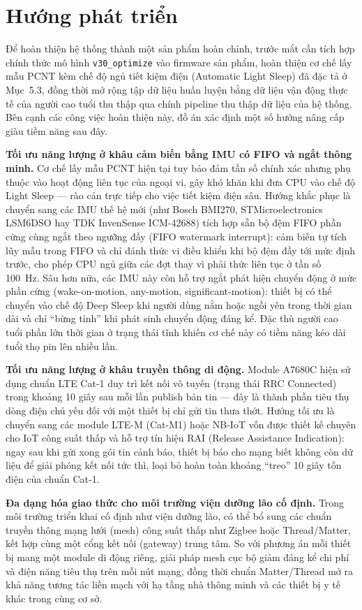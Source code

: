 \documentclass[../DoAn.tex]{subfiles}
\begin{document}
\section{Hướng phát triển}
Để hoàn thiện hệ thống thành một sản phẩm hoàn chỉnh, trước mắt cần tích hợp chính thức mô hình \texttt{v30\_optimize} vào firmware sản phẩm, hoàn thiện cơ chế lấy mẫu PCNT kèm chế độ ngủ tiết kiệm điện (Automatic Light Sleep) đã đặc tả ở Mục~5.3, đồng thời mở rộng tập dữ liệu huấn luyện bằng dữ liệu vận động thực tế của người cao tuổi thu thập qua chính pipeline thu thập dữ liệu của hệ thống. Bên cạnh các công việc hoàn thiện này, đồ án xác định một số hướng nâng cấp giàu tiềm năng sau đây.

\textbf{Tối ưu năng lượng ở khâu cảm biến bằng IMU có FIFO và ngắt thông minh.} Cơ chế lấy mẫu PCNT hiện tại tuy bảo đảm tần số chính xác nhưng phụ thuộc vào hoạt động liên tục của ngoại vi, gây khó khăn khi đưa CPU vào chế độ Light Sleep --- rào cản trực tiếp cho việc tiết kiệm điện sâu. Hướng khắc phục là chuyển sang các IMU thế hệ mới (như Bosch BMI270, STMicroelectronics LSM6DSO hay TDK InvenSense ICM-42688) tích hợp sẵn bộ đệm FIFO phần cứng cùng ngắt theo ngưỡng đầy (FIFO watermark interrupt): cảm biến tự tích lũy mẫu trong FIFO và chỉ đánh thức vi điều khiển khi bộ đệm đầy tới mức định trước, cho phép CPU ngủ giữa các đợt thay vì phải thức liên tục ở tần số 100~Hz. Sâu hơn nữa, các IMU này còn hỗ trợ ngắt phát hiện chuyển động ở mức phần cứng (wake-on-motion, any-motion, significant-motion): thiết bị có thể chuyển vào chế độ Deep Sleep khi người dùng nằm hoặc ngồi yên trong thời gian dài và chỉ ``bừng tỉnh'' khi phát sinh chuyển động đáng kể. Đặc thù người cao tuổi phần lớn thời gian ở trạng thái tĩnh khiến cơ chế này có tiềm năng kéo dài tuổi thọ pin lên nhiều lần.

\textbf{Tối ưu năng lượng ở khâu truyền thông di động.} Module A7680C hiện sử dụng chuẩn LTE Cat-1 duy trì kết nối vô tuyến (trạng thái RRC Connected) trong khoảng 10 giây sau mỗi lần publish bản tin --- đây là thành phần tiêu thụ dòng điện chủ yếu đối với một thiết bị chỉ gửi tin thưa thớt. Hướng tối ưu là chuyển sang các module LTE-M (Cat-M1) hoặc NB-IoT vốn được thiết kế chuyên cho IoT công suất thấp và hỗ trợ tín hiệu RAI (Release Assistance Indication): ngay sau khi gửi xong gói tin cảnh báo, thiết bị báo cho mạng biết không còn dữ liệu để giải phóng kết nối tức thì, loại bỏ hoàn toàn khoảng ``treo'' 10 giây tốn điện của chuẩn Cat-1.

\textbf{Đa dạng hóa giao thức cho môi trường viện dưỡng lão cố định.} Trong môi trường triển khai cố định như viện dưỡng lão, có thể bổ sung các chuẩn truyền thông mạng lưới (mesh) công suất thấp như Zigbee hoặc Thread/Matter, kết hợp cùng một cổng kết nối (gateway) trung tâm. So với phương án mỗi thiết bị mang một module di động riêng, giải pháp mesh cục bộ giảm đáng kể chi phí và điện năng tiêu thụ trên mỗi nút mạng, đồng thời chuẩn Matter/Thread mở ra khả năng tương tác liền mạch với hạ tầng nhà thông minh và các thiết bị y tế khác trong cùng cơ sở.
\end{document}
